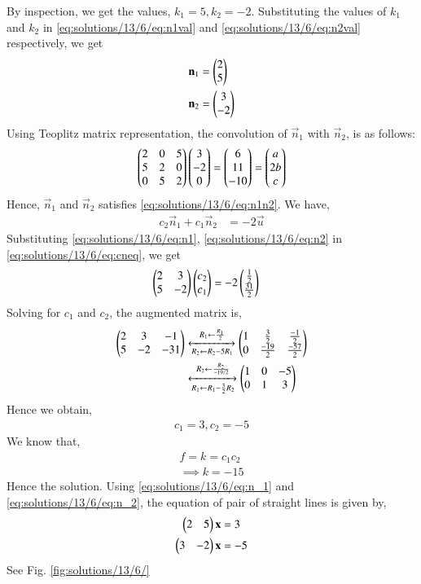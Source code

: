 By inspection, we get the values, $k_1 = 5, k_2 = -2$. Substituting the values of $k_1$ and $k_2$ in \eqref{eq:solutions/13/6/eq:n1val} and \eqref{eq:solutions/13/6/eq:n2val} respectively, we get
\begin{align}
	\mathbf{n}_1 &= \begin{pmatrix}2 \\ 5\end{pmatrix} \label{eq:solutions/13/6/eq:n1}\\
	\mathbf{n}_2 &= \begin{pmatrix}3 \\ -2\end{pmatrix} \label{eq:solutions/13/6/eq:n2}
\end{align}
Using Teoplitz matrix representation, the convolution of $\vec{n}_1$ with $\vec{n}_2$, is as follows:
\begin{align}
	\begin{pmatrix}2 & 0 & 5\\ 5 & 2 & 0\\ 0 & 5 & 2\end{pmatrix}\begin{pmatrix}3\\-2\\0\end{pmatrix} = \begin{pmatrix}6 \\11 \\ -10\end{pmatrix} = \begin{pmatrix}a \\ 2b \\ c\end{pmatrix}
\end{align}
Hence, $\vec{n}_1$ and $\vec{n}_2$ satisfies \eqref{eq:solutions/13/6/eq:n1n2}.
We have,
\begin{align}
	c_2\vec{n}_1 + c_1\vec{n}_2 &= -2\vec{u} \label{eq:solutions/13/6/eq:cneq}
\end{align}
Substituting \eqref{eq:solutions/13/6/eq:n1}, \eqref{eq:solutions/13/6/eq:n2} in \eqref{eq:solutions/13/6/eq:cneq}, we get
\begin{align}
 \begin{pmatrix}2 & 3\\ 5 & -2\end{pmatrix}\begin{pmatrix}c_2 \\ c_1\end{pmatrix} &= -2\begin{pmatrix}\frac{1}{2} \\ \frac{31}{2}\end{pmatrix}
\end{align}
Solving for $c_1$ and $c_2$, the augmented matrix is,
\begin{align}
	\begin{pmatrix}2 & 3 & -1\\ 5 & -2 & -31\end{pmatrix} &\xleftrightarrow[R_2 \leftarrow R_2 - 5R_1]{R_1 \leftarrow \frac{R_1}{2}} \begin{pmatrix}1 & \frac{3}{2}  & \frac{-1}{2} \\ 0 & \frac{-19}{2} & \frac{-57}{2}\end{pmatrix} \\
	&\xleftrightarrow[R_1 \leftarrow R_1 - \frac{3}{2}R_2]{R_2 \leftarrow \frac{R_2}{-19/2}} \begin{pmatrix}1 & 0 & -5\\0 & 1 & 3\end{pmatrix}
\end{align}
Hence we obtain,
\begin{align}
	c_1 = 3, c_2 = -5
\end{align}
We know that,
\begin{align}
	f = k = c_1c_2\\
	\implies \boxed{k = -15}
\end{align}
Hence the solution. Using \eqref{eq:solutions/13/6/eq:n_1} and \eqref{eq:solutions/13/6/eq:n_2}, the equation of pair of straight lines is given by,
\begin{align}
\begin{pmatrix}2 & 5\end{pmatrix}\mathbf{x} &= 3\\
\begin{pmatrix}3 & -2\end{pmatrix}\mathbf{x} &= -5
\end{align}
See Fig. \ref{fig:solutions/13/6/}


